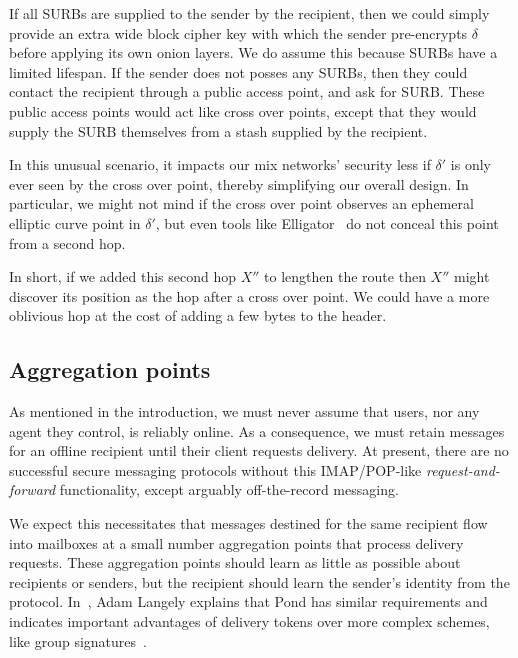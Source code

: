 \documentclass[twoside,letterpaper]{llncs}
\begin{document}
If all SURBs are supplied to the sender by the recipient, then
we could simply provide an extra wide block cipher key with which
the sender pre-encrypts $\delta$ before applying its own onion layers.
We do assume this because SURBs have a limited lifespan.  
If the sender does not posses any SURBs, then they could contact the
recipient through a public access point, and ask for SURB. 
These public access points would act like cross over points, except
that they would supply the SURB themselves from a stash supplied by
the recipient.

In this unusual scenario, it impacts our mix networks' security
less if $\delta'$ is only ever seen by the cross over point, thereby
simplifying our overall design.   In particular, we might not mind
if the cross over point observes an ephemeral elliptic curve point
in $\delta'$, but even tools like Elligator~\cite{elligator} do not
conceal this point from a second hop.

In short, if we added this second hop $X''$ to lengthen the route
then $X''$ might discover its position as the hop after a cross over
point.  We could have a more oblivious hop at the cost of adding a
few bytes to the header.

\subsection{Aggregation points}

As mentioned in the introduction, we must never assume that users,
nor any agent they control, is reliably online.  
As a consequence, we must retain messages for an offline recipient
until their client requests delivery.  
At present, there are no successful secure messaging protocols
without this IMAP/POP-like {\em request-and-forward} functionality,
except arguably off-the-record messaging. 

We expect this necessitates that messages destined for the same
recipient flow into mailboxes at a small number aggregation points
that process delivery requests.  These aggregation points should
learn as little as possible about recipients or senders, but the
recipient should learn the sender's identity from the protocol.
In~\cite{agl-pond-hmac}, Adam Langely explains that Pond has similar
requirements and indicates important advantages of delivery tokens
over more complex schemes, like group signatures~\cite{VLR,BBS}.
\end{document}
